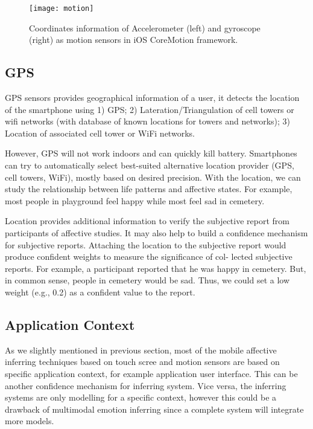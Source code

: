\begin{figure}
    \centering
    \texttt{[image: motion]}
    \caption{Coordinates information of Accelerometer (left) and gyroscope (right) as motion sensors in iOS CoreMotion framework.}
    \label{fig:motion}
\end{figure}

\subsection{GPS}\label{subsec:gps}

GPS sensors provides geographical information of a user, it detects the location of the smartphone using 1) GPS; 2) Lateration/Triangulation of cell towers or wifi networks (with database of known locations for towers and networks); 3) Location of associated cell tower or WiFi networks.

However, GPS will not work indoors and can quickly kill battery. Smartphones can try to automatically select best-suited alternative location provider (GPS, cell towers, WiFi), mostly based on desired precision. With the location, we can study the relationship between life patterns and affective states. For example, most people in playground feel happy while most feel sad in cemetery.

Location provides additional information to verify the subjective report from participants of affective studies. It may also help to build a confidence mechanism \cite{tan2013connectivity} for subjective reports. Attaching the location to the subjective report would produce confident weights to measure the significance of col- lected subjective reports. For example, a participant reported that he was happy in cemetery. But, in common sense, people in cemetery would be sad. Thus, we could set a low weight (e.g., 0.2) as a confident value to the report.

\subsection{Application Context}\label{subsec:ui}

As we slightly mentioned in previous section, most of the mobile affective inferring techniques based on touch scree and motion sensors\cite{Gao2012, Shah2015, Mottelson2016, bhattacharya2017predictive} are based on specific application context, for example application user interface. This can be another confidence mechanism for inferring system. Vice versa, the inferring systems are only modelling for a specific context, however this could be a drawback of multimodal emotion inferring since a complete system will integrate more models.